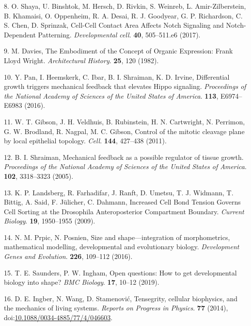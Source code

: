 \documentclass[11pt,singlespacinge,twoside]{reedthesis} %
\theoremstyle{definition}
\theoremstyle{definition}
\theoremstyle{definition}
\theoremstyle{remark}
\begin{document}
\leavevmode\hypertarget{ref-Shaya2017a}{}%
8. O. Shaya, U. Binshtok, M. Hersch, D. Rivkin, S. Weinreb, L. Amir-Zilberstein, B. Khamaisi, O. Oppenheim, R. A. Desai, R. J. Goodyear, G. P. Richardson, C. S. Chen, D. Sprinzak, Cell-Cell Contact Area Affects Notch Signaling and Notch-Dependent Patterning. \emph{Developmental cell}. \textbf{40}, 505--511.e6 (2017).

\leavevmode\hypertarget{ref-Davies1982}{}%
9. M. Davies, The Embodiment of the Concept of Organic Expression: Frank Lloyd Wright. \emph{Architectural History}. \textbf{25}, 120 (1982).

\leavevmode\hypertarget{ref-Pan2016}{}%
10. Y. Pan, I. Heemskerk, C. Ibar, B. I. Shraiman, K. D. Irvine, Differential growth triggers mechanical feedback that elevates Hippo signaling. \emph{Proceedings of the National Academy of Sciences of the United States of America}. \textbf{113}, E6974--E6983 (2016).

\leavevmode\hypertarget{ref-Gibson2011}{}%
11. W. T. Gibson, J. H. Veldhuis, B. Rubinstein, H. N. Cartwright, N. Perrimon, G. W. Brodland, R. Nagpal, M. C. Gibson, Control of the mitotic cleavage plane by local epithelial topology. \emph{Cell}. \textbf{144}, 427--438 (2011).

\leavevmode\hypertarget{ref-Shraiman2005}{}%
12. B. I. Shraiman, Mechanical feedback as a possible regulator of tissue growth. \emph{Proceedings of the National Academy of Sciences of the United States of America}. \textbf{102}, 3318--3323 (2005).

\leavevmode\hypertarget{ref-Landsberg2009}{}%
13. K. P. Landsberg, R. Farhadifar, J. Ranft, D. Umetsu, T. J. Widmann, T. Bittig, A. Said, F. Jülicher, C. Dahmann, Increased Cell Bond Tension Governs Cell Sorting at the Drosophila Anteroposterior Compartment Boundary. \emph{Current Biology}. \textbf{19}, 1950--1955 (2009).

\leavevmode\hypertarget{ref-Prpic2016}{}%
14. N. M. Prpic, N. Posnien, Size and shape---integration of morphometrics, mathematical modelling, developmental and evolutionary biology. \emph{Development Genes and Evolution}. \textbf{226}, 109--112 (2016).

\leavevmode\hypertarget{ref-Saunders2019}{}%
15. T. E. Saunders, P. W. Ingham, Open questions: How to get developmental biology into shape? \emph{BMC Biology}. \textbf{17}, 10--12 (2019).

\leavevmode\hypertarget{ref-Ingber2014}{}%
16. D. E. Ingber, N. Wang, D. Stamenović, Tensegrity, cellular biophysics, and the mechanics of living systems. \emph{Reports on Progress in Physics}. \textbf{77} (2014), doi:\href{https://doi.org/10.1088/0034-4885/77/4/046603}{10.1088/0034-4885/77/4/046603}.
\end{document}
